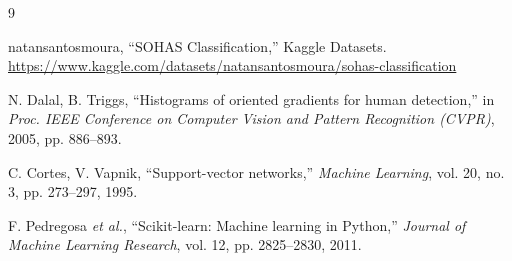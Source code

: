 \renewcommand{\refname}{TÀI LIỆU THAM KHẢO}
{}
\begin{thebibliography}{9}

natansantosmoura, ``SOHAS Classification,'' Kaggle Datasets.
\url{https://www.kaggle.com/datasets/natansantosmoura/sohas-classification}

N. Dalal, B. Triggs,
``Histograms of oriented gradients for human detection,''
in \emph{Proc. IEEE Conference on Computer Vision and Pattern Recognition (CVPR)}, 2005, pp. 886--893.

C. Cortes, V. Vapnik,
``Support-vector networks,''
\emph{Machine Learning}, vol. 20, no. 3, pp. 273--297, 1995.

F. Pedregosa \emph{et al.},
``Scikit-learn: Machine learning in Python,''
\emph{Journal of Machine Learning Research}, vol. 12, pp. 2825--2830, 2011.

\end{thebibliography}
